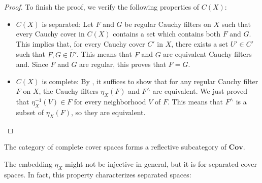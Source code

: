 \documentclass[reqno]{amsart}
\theoremstyle{definition}
\theoremstyle{remark}
\numberwithin{figure}{section}
\newcommand{\cat}[1]{\mathbf{#1}}
\begin{document}
\begin{proof}
To finish the proof, we verify the following properties of $C(X)$:
\begin{itemize}
\item $C(X)$ is separated:
        Let $F$ and $G$ be regular Cauchy filters on $X$ such that every Cauchy cover in $C(X)$ contains a set which contains both $F$ and $G$.
        This implies that, for every Cauchy cover $C'$ in $X$, there exists a set $U' \in C'$ such that $F,G \in \widetilde{U'}$.
        This means that $F$ and $G$ are equivalent Cauchy filters and.
        Since $F$ and $G$ are regular, this proves that $F = G$.
\item $C(X)$ is complete:
        By , it suffices to show that for any regular Cauchy filter $F$ on $X$, the Cauchy filters $\eta_X(F)$ and $F^\wedge$ are equivalent.
        We just proved that $\eta_X^{-1}(V) \in F$ for every neighborhood $V$ of $F$.
        This means that $F^\wedge$ is a subset of $\eta_X(F)$, so they are equivalent.
\end{itemize}
\end{proof}

\begin{cor}
The category of complete cover spaces forms a reflective subcategory of $\cat{Cov}$.
\end{cor}

The embedding $\eta_X$ might not be injective in general, but it is for separated cover spaces.
In fact, this property characterizes separated spaces:
\end{document}
